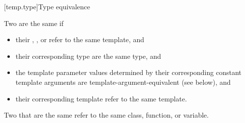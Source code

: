 [temp.type]{Type equivalence}

\pnum
{}%
Two  are the same if
\begin{itemize}
\item
their ,
, or
refer to the same template, and

\item
their corresponding type 
are the same type, and

\item
the template parameter values determined by
their corresponding constant template arguments
are template-argument-equivalent (see below), and

\item
their corresponding template 
refer to the same template.
\end{itemize}
Two  that are the same
refer to the same class, function, or variable.

